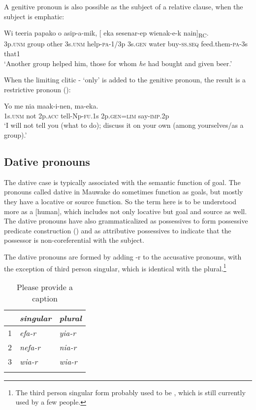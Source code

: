 A genitive pronoun is also possible as the subject of a relative clause, when the subject is emphatic:

\ea%
\label{ex:3:x1809}
\gll Wi teeria papako o asip-a-mik, [ eka sesenar-ep wienak-e-k nain]\textsubscript{RC}.
\\
3p.\textsc{unm} group other 3s.\textsc{unm} help-\textsc{pa}-1/3p 3s.\textsc{gen} water buy-\textsc{ss}.\textsc{seq} feed.them-\textsc{pa}-3s that1\\
\glt`Another group helped him, those for whom \textit{he} had bought and given beer.'
\z

When the limiting clitic - `only' is added to the genitive pronoun, the result is a restrictive pronoun ():

\ea%
\label{ex:3:x604}
\gll Yo me nia maak-i-nen,  ma-eka. \\
1s.\textsc{unm} not 2p.\textsc{acc} tell-Np-\textsc{fu}.1s 2p.\textsc{gen}=\textsc{lim} say-\textsc{imp}.2p\\
\glt`I will not tell you (what to do); discuss it on your own (among yourselves/as a group).'
\z

\subsection{Dative pronouns}\label{sec:3.5.5}
{}
The dative case is typically associated with the semantic function of goal. The pronouns called dative in Mauwake do sometimes function as goals, but mostly they have a locative or source function. So the term here is to be understood more as a [\textstyleEmphasizedWords{{+}}human]\textstyleEmphasizedWords{ }, which includes not only locative but goal and source as well. The dative pronouns have also grammaticalized as possessives to form possessive predicate construction () and as attributive possessives to indicate that the possessor is non-coreferential with the subject. 

The dative pronouns are formed by adding -r to the accusative pronouns, with the exception of third person singular, which is identical with the plural.\footnote{The third person singular form probably used to be , which is still currently used by a few people.}

\begin{table}
\caption{Please provide a caption}
 
\begin{tabular}{l>{\itshape}l>{\itshape}l}
\mytoprule
 &\upshape singular &\upshape plural\\
\midrule
1 &efa-r &yia-r\\
2 &nefa-r &nia-r\\
3 &wia-r &wia-r\\
\mybottomrule
\end{tabular}
\end{table}


